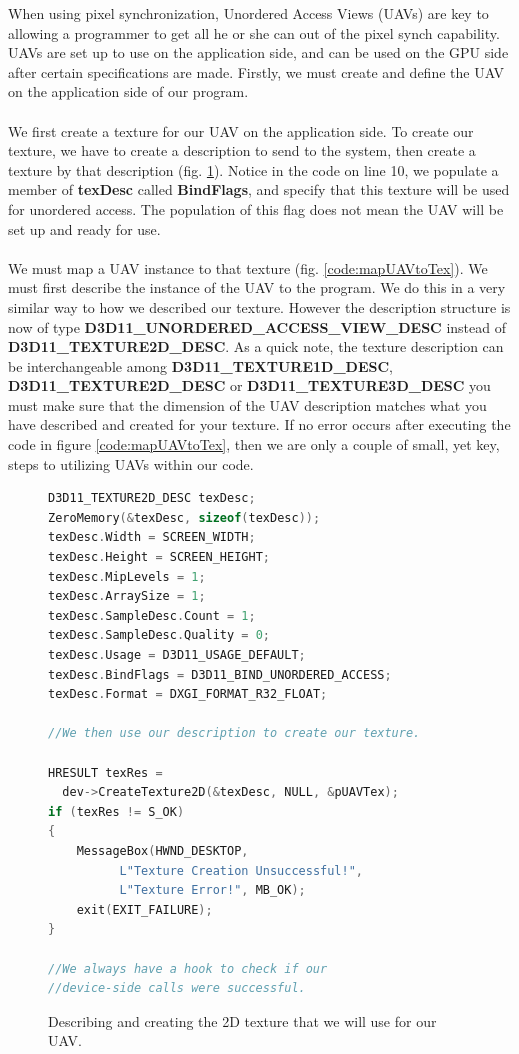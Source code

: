 \documentclass[a4paper, 12pt]{article}
\begin{document}
When using pixel synchronization, Unordered Access Views (UAVs) are key to
allowing a programmer to get all he or she can out of the pixel synch
capability. UAVs are set up to use on the application side, and can be used on
the GPU side after certain specifications are made. Firstly, we must create
and define the UAV on the application side of our program. \\ \\ We first
create a texture for our UAV on the application side. To create our texture,
we have to create a description to send to the system, then create a texture
by that description (fig. \ref{code:texDesc}). Notice in the code on line 10,
we populate a member of \textbf{texDesc} called \textbf{BindFlags}, and
specify that this texture will be used for unordered access. The population of
this flag does not mean the UAV will be set up and ready for use. \\ \\ We
must map a UAV instance to that texture (fig. \ref{code:mapUAVtoTex}). We must
first describe the instance of the UAV to the program. We do this in a very
similar way to how we described our texture. However the description structure
is now of type \textbf{D3D11\_UNORDERED\_ACCESS\_VIEW\_DESC} instead of
\textbf{D3D11\_TEXTURE2D\_DESC}. As a quick note, the texture description can
be interchangeable among \textbf{D3D11\_TEXTURE1D\_DESC},
\textbf{D3D11\_TEXTURE2D\_DESC} or \textbf{D3D11\_TEXTURE3D\_DESC}\; you must
make sure that the dimension of the UAV description matches what you have
described and created for your texture. If no error occurs after executing the
code in figure \ref{code:mapUAVtoTex}, then we are only a couple of small, yet
key, steps to utilizing UAVs within our code.

\begin{figure}[h]
\begin{lstlisting}[language=C++]
D3D11_TEXTURE2D_DESC texDesc;
ZeroMemory(&texDesc, sizeof(texDesc));
texDesc.Width = SCREEN_WIDTH;
texDesc.Height = SCREEN_HEIGHT;
texDesc.MipLevels = 1;
texDesc.ArraySize = 1;
texDesc.SampleDesc.Count = 1;
texDesc.SampleDesc.Quality = 0;
texDesc.Usage = D3D11_USAGE_DEFAULT;
texDesc.BindFlags = D3D11_BIND_UNORDERED_ACCESS;
texDesc.Format = DXGI_FORMAT_R32_FLOAT;

//We then use our description to create our texture.

HRESULT texRes = 
  dev->CreateTexture2D(&texDesc, NULL, &pUAVTex);
if (texRes != S_OK)
{
	MessageBox(HWND_DESKTOP, 
		  L"Texture Creation Unsuccessful!", 
		  L"Texture Error!", MB_OK);
	exit(EXIT_FAILURE);
}

//We always have a hook to check if our 
//device-side calls were successful.

\end{lstlisting}
\caption{Describing and creating the 2D texture that we will use for our UAV.}
\label{code:texDesc}
\end{figure}
\end{document}
